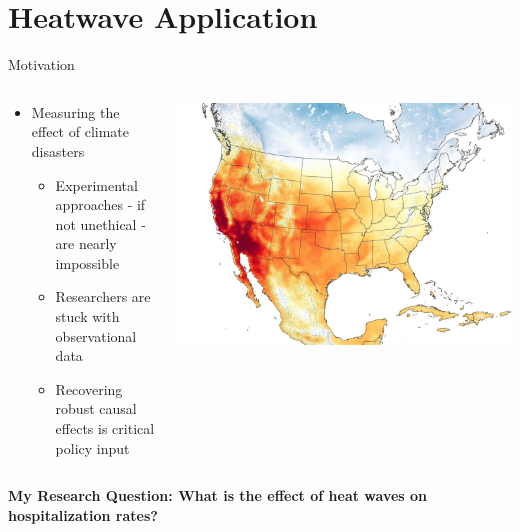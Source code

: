 \section{Heatwave Application}

\begin{frame}{Motivation}

  \begin{columns}
    \begin{column}{0.6\linewidth}
      \begin{itemize}
        \item Measuring the effect of climate disasters
            \begin{itemize}
            \item Experimental approaches - if not unethical - are nearly impossible
            \item Researchers are stuck with observational data
            \item Recovering robust causal effects is critical policy input
            \end{itemize}
      \end{itemize}
    \end{column}
    \begin{column}{0.4\linewidth}
      \includegraphics[scale=0.1]{figures/california-heatwave-2020-nasa-eo.jpeg}
      \caption{}
    \end{column}
  \end{columns}

\vspace{7pt}
\begin{center}
    \textbf{My Research Question: What is the effect of heat waves on hospitalization rates?}
\end{center}


\end{frame}

